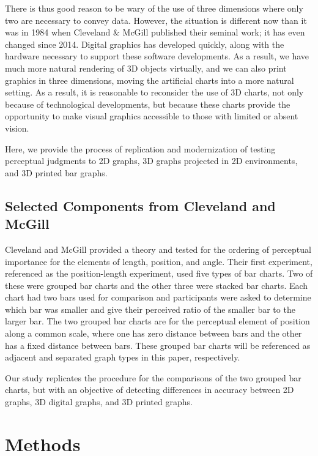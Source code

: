 \documentclass[letterpaper,inpress,dvipsnames]{jdsart}
\begin{document}
There is thus good reason to be wary of the use of three dimensions where only two are necessary to convey data.
However, the situation is different now than it was in 1984 when Cleveland \& McGill published their seminal work; it has even changed since 2014.
Digital graphics has developed quickly, along with the hardware necessary to support these software developments.
As a result, we have much more natural rendering of 3D objects virtually, and we can also print graphics in three dimensions, moving the artificial charts into a more natural setting.
As a result, it is reasonable to reconsider the use of 3D charts, not only because of technological developments, but because these charts provide the opportunity to make visual graphics accessible to those with limited or absent vision.

Here, we provide the process of replication and modernization of testing perceptual judgments to 2D graphs, 3D graphs projected in 2D environments, and 3D printed bar graphs.

\hypertarget{selected-components-from-cleveland-and-mcgill}{%
\subsection{Selected Components from Cleveland and McGill}\label{selected-components-from-cleveland-and-mcgill}}

Cleveland and McGill provided a theory and tested for the ordering of perceptual importance for the elements of length, position, and angle.
Their first experiment, referenced as the position-length experiment, used five types of bar charts.
Two of these were grouped bar charts and the other three were stacked bar charts.
Each chart had two bars used for comparison and participants were asked to determine which bar was smaller and give their perceived ratio of the smaller bar to the larger bar.
The two grouped bar charts are for the perceptual element of position along a common scale, where one has zero distance between bars and the other has a fixed distance between bars.
These grouped bar charts will be referenced as adjacent and separated graph types in this paper, respectively.

Our study replicates the procedure for the comparisons of the two grouped bar charts, but with an objective of detecting differences in accuracy between 2D graphs, 3D digital graphs, and 3D printed graphs.

\hypertarget{methods}{%
\section{Methods}\label{methods}}
\end{document}
